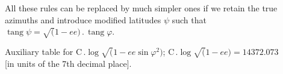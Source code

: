 \par\clearpage
\noindent\makebox[12mm][l]{}\par\medskip

All these rules can be replaced by much simpler ones
if we retain the true azimuths and introduce modified latitudes \(\psi\)
such that \(\operatorname{tang}\psi=\surd(1-ee)\,.\,\operatorname{tang}\varphi\).

\begin{center}
Auxiliary table for \(\mathrm C\,.\log\surd(1-ee\sin\varphi^2)\);
\(\mathrm C\,.\log\surd(1-ee)=14372.073\)\\
{[in units of the 7th decimal place].}
\end{center}

